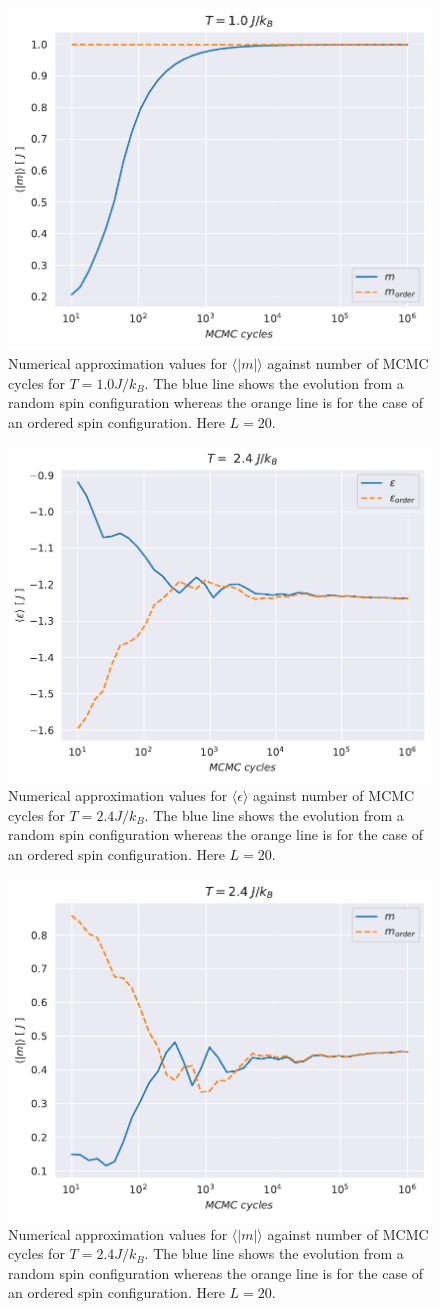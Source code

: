 \documentclass[english,notitlepage,reprint,nofootinbib]{revtex4-1}  %
\begin{document}
\begin{figure}[H]
    \centering
    \includegraphics[width=.5\textwidth]{../figures/numeric_L_20_T_1_m.pdf}
    \caption{Numerical approximation values for $\langle |m| \rangle$ against number of MCMC cycles for $T=1.0 J/k_B$. The blue line shows the evolution from a random spin configuration whereas the orange line is for the case of an ordered spin configuration. Here $L=20$.}
    \label{fig:numeric_L_20_T_1_m}
\end{figure}

\begin{figure}[H]
    \centering
    \includegraphics[width=.5\textwidth]{../figures/numeric_L_20_T_2_4_e.pdf}
    \caption{Numerical approximation values for $\langle \epsilon \rangle$ against number of MCMC cycles for $T=2.4 J/k_B$. The blue line shows the evolution from a random spin configuration whereas the orange line is for the case of an ordered spin configuration. Here $L=20$.}
    \label{fig:numeric_L_20_T_2_4_e}
\end{figure}

\begin{figure}[H]
    \centering
    \includegraphics[width=.5\textwidth]{../figures/numeric_L_20_T_2_4_m.pdf}
    \caption{Numerical approximation values for $\langle |m| \rangle$ against number of MCMC cycles for $T=2.4 J/k_B$. The blue line shows the evolution from a random spin configuration whereas the orange line is for the case of an ordered spin configuration. Here $L=20$.}
    \label{fig:numeric_L_20_T_2_4_m}
\end{figure}
\end{document}

